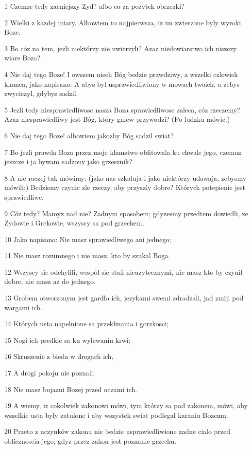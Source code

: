 \par 1 Czemze tedy zacniejszy Zyd? albo co za pozytek obrzezki?
\par 2 Wielki z kazdej miary. Albowiem to najpierwsza, iz im zwierzone byly wyroki Boze.
\par 3 Bo cóz na tem, jezli niektórzy nie uwierzyli? Azaz niedowiarstwo ich niszczy wiare Boza?
\par 4 Nie daj tego Boze! I owszem niech Bóg bedzie prawdziwy, a wszelki czlowiek klamca, jako napisano: A abys byl usprawiedliwiony w mowach twoich, a zebys zwyciezyl, gdybys sadzil.
\par 5 Jezli tedy niesprawiedliwosc nasza Boza sprawiedliwosc zaleca, cóz rzeczemy? Azaz niesprawiedliwy jest Bóg, który gniew przywodzi? (Po ludzku mówie.)
\par 6 Nie daj tego Boze! albowiem jakozby Bóg sadzil swiat?
\par 7 Bo jezli prawda Boza przez moje klamstwo obfitowala ku chwale jego, czemuz jeszcze i ja bywam sadzony jako grzesznik?
\par 8 A nie raczej tak mówimy: (jako nas szkaluja i jako niektórzy udawaja, zebysmy mówili:) Bedziemy czynic zle rzeczy, aby przyszly dobre? Których potepienie jest sprawiedliwe.
\par 9 Cóz tedy? Mamyz nad nie? Zadnym sposobem; gdyzesmy przedtem dowiedli, ze Zydowie i Grekowie, wszyscy sa pod grzechem,
\par 10 Jako napisano: Nie masz sprawiedliwego ani jednego;
\par 11 Nie masz rozumnego i nie masz, kto by szukal Boga.
\par 12 Wszyscy sie odchylili, wespól sie stali nieuzytecznymi, nie masz kto by czynil dobre, nie masz az do jednego.
\par 13 Grobem otworzonym jest gardlo ich, jezykami swemi zdradzali, jad zmiji pod wargami ich.
\par 14 Których usta napelnione sa przeklinania i gorzkosci;
\par 15 Nogi ich predkie sa ku wylewaniu krwi;
\par 16 Skruszenie z bieda w drogach ich,
\par 17 A drogi pokoju nie poznali;
\par 18 Nie masz bojazni Bozej przed oczami ich.
\par 19 A wiemy, iz cokolwiek zakonowi mówi, tym którzy sa pod zakonem, mówi, aby wszelkie usta byly zatulone i aby wszystek swiat podlegal karaniu Bozemu.
\par 20 Przeto z uczynków zakonu nie bedzie usprawiedliwione zadne cialo przed oblicznoscia jego, gdyz przez zakon jest poznanie grzechu.
